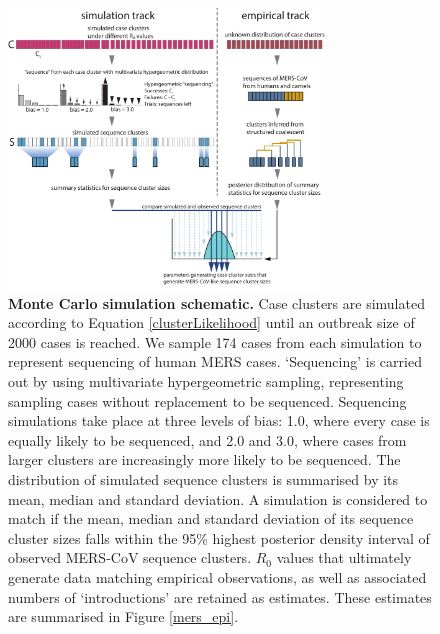 \documentclass[11pt,oneside,letterpaper]{article}
\begin{document}
\begin{figure}[h]
\centering
	\includegraphics[width=0.75\textwidth]{figures/mers_mc_method.pdf}
	\caption{\textbf{Monte Carlo simulation schematic.}
Case clusters are simulated according to Equation \ref{clusterLikelihood} until an outbreak size of 2000 cases is reached.
We sample 174 cases from each simulation to represent sequencing of human MERS cases.
`Sequencing' is carried out by using multivariate hypergeometric sampling, representing sampling cases without replacement to be sequenced.
Sequencing simulations take place at three levels of bias: 1.0, where every case is equally likely to be sequenced, and 2.0 and 3.0, where cases from larger clusters are increasingly more likely to be sequenced.
The distribution of simulated sequence clusters is summarised by its mean, median and standard deviation.
A simulation is considered to match if the mean, median and standard deviation of its sequence cluster sizes falls within the 95\% highest posterior density interval of observed MERS-CoV sequence clusters.
$R_{0}$ values that ultimately generate data matching empirical observations, as well as associated numbers of `introductions' are retained as estimates.
These estimates are summarised in Figure \ref{mers_epi}.
	}
	\label{mc_method}
\end{figure}
\end{document}
